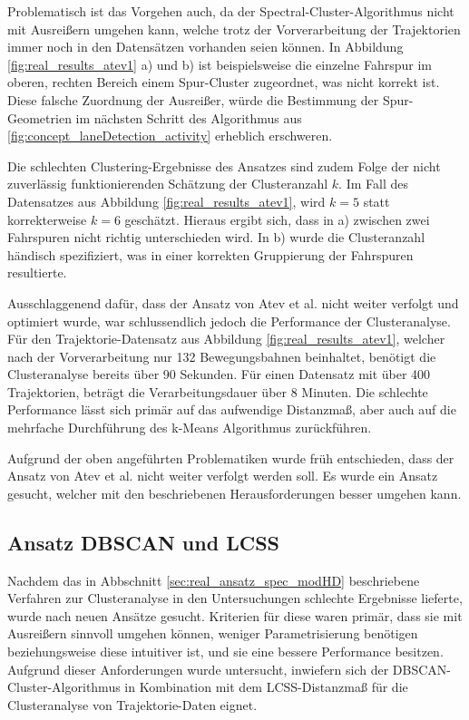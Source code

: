Problematisch ist das Vorgehen auch, da der Spectral-Cluster-Algorithmus nicht mit Ausreißern umgehen kann,
welche trotz der Vorverarbeitung der Trajektorien immer noch in den Datensätzen vorhanden seien können.
In Abbildung \ref{fig:real_results_atev1} a) und b) ist beispielsweise die einzelne Fahrspur im oberen, rechten Bereich
einem Spur-Cluster zugeordnet, was nicht korrekt ist.
Diese falsche Zuordnung der Ausreißer, würde die Bestimmung der Spur-Geometrien im nächsten Schritt des
Algorithmus aus \ref{fig:concept_laneDetection_activity} erheblich erschweren.

Die schlechten Clustering-Ergebnisse des Ansatzes sind zudem Folge der nicht zuverlässig funktionierenden Schätzung
der Clusteranzahl $k$. Im Fall des Datensatzes aus Abbildung \ref{fig:real_results_atev1}, wird $k = 5$
statt korrekterweise $k = 6$ geschätzt. Hieraus ergibt sich, dass in a) zwischen zwei Fahrspuren nicht richtig unterschieden wird.
In b) wurde die Clusteranzahl händisch spezifiziert, was in einer korrekten Gruppierung der Fahrspuren resultierte.

Ausschlaggenend dafür, dass der Ansatz von Atev et al. nicht weiter verfolgt und optimiert wurde, war schlussendlich
jedoch die Performance der Clusteranalyse. Für den Trajektorie-Datensatz aus Abbildung \ref{fig:real_results_atev1},
welcher nach der Vorverarbeitung nur 132 Bewegungsbahnen beinhaltet, benötigt die Clusteranalyse bereits über
90 Sekunden. Für einen Datensatz mit über 400 Trajektorien, beträgt die Verarbeitungsdauer über 8 Minuten.
Die schlechte Performance lässt sich primär auf das aufwendige Distanzmaß, aber auch auf die mehrfache
Durchführung des k-Means Algorithmus zurückführen.

Aufgrund der oben angeführten Problematiken wurde früh entschieden, dass der Ansatz von Atev et al. nicht weiter
verfolgt werden soll. Es wurde ein Ansatz gesucht, welcher mit den beschriebenen Herausforderungen besser
umgehen kann.

\subsection{Ansatz DBSCAN und LCSS}
\label{sec:real_ansatz_dbscan_lcss}

Nachdem das in Abbschnitt \ref{sec:real_ansatz_spec_modHD} beschriebene Verfahren zur Clusteranalyse in
den Untersuchungen schlechte Ergebnisse lieferte, wurde nach neuen Ansätze gesucht.
Kriterien für diese waren primär, dass sie mit Ausreißern sinnvoll umgehen können, weniger Parametrisierung
benötigen beziehungsweise diese intuitiver ist, und sie eine bessere Performance besitzen.
Aufgrund dieser Anforderungen wurde untersucht, inwiefern sich der DBSCAN-Cluster-Algorithmus
in Kombination mit dem LCSS-Distanzmaß für die Clusteranalyse von Trajektorie-Daten eignet.

